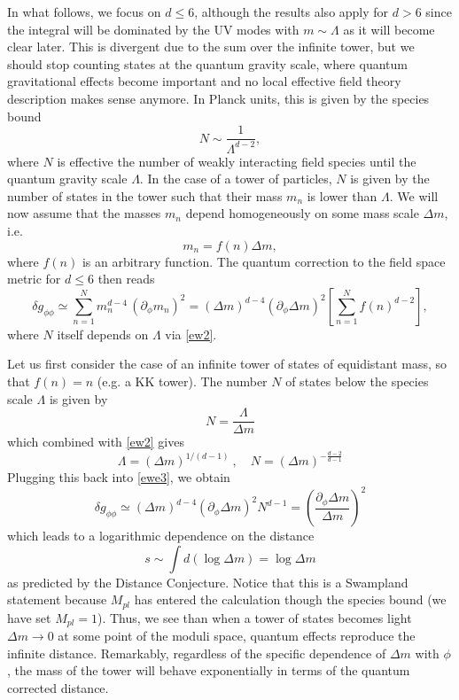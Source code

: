 \documentclass[11pt]{article}
\numberwithin{equation}{section}
\newcommand{\beq}{\begin{equation}}  \newcommand{\eeq}{\end{equation}}
\numberwithin{equation}{section}
\theoremstyle{remark}
\begin{document}
In what follows, we focus on $d\leq 6$, although the results also apply for $d>6$ since the integral will be dominated by the UV modes with $m\sim \Lambda$ as it will become clear later. 
This is divergent due to the sum over the infinite tower, but we should stop counting states at the quantum gravity scale, where quantum gravitational effects become important and no local effective field theory description makes sense anymore. In Planck units, this is given by the species bound \cite{ArkaniHamed:2005yv,Dvali:2007wp,Dvali:2007hz,Dvali:2010vm}
\begin{equation}N\sim \frac{1}{\Lambda^{d-2}},\label{ew2}\end{equation}
where $N$ is effective the number of weakly interacting field species until the quantum gravity scale $\Lambda$. In the case of a tower of particles, $N$ is given by  
the number of states in the tower such that their mass $m_n$ is lower than $\Lambda$.
 We will now assume that the masses $m_n$ depend homogeneously on some mass scale $\Delta m$, i.e.
%
\begin{equation}
 m_n=f(n) \Delta m,
 \end{equation}
where $f(n)$ is an arbitrary function. The quantum correction to the  field space metric for $d\leq 6$ then reads
\begin{equation} \delta g_{\phi\phi}\simeq  \sum^N_{n=1} m_n^{d-4}\, (\partial_\phi m_n)^2= (\Delta m)^{d-4}( \partial_\phi \Delta m)^2 \left[\sum^N_{n=1}f(n)^{d-2}\right],\label{ewe3}\end{equation}
where $N$ itself depends on $\Lambda$ via \eqref{ew2}.

 Let us first consider the case of an infinite tower of states of equidistant mass, so that $f(n)=n$ (e.g. a KK tower).
The number $N$ of states below the species scale $\Lambda$ is given by
\beq
N=\frac{\Lambda}{\Delta m}
\eeq
which combined with \eqref{ew2} gives
\beq
\Lambda=(\Delta m)^{1/(d-1)}\ , \quad N=( \Delta m)^{-\frac{d-2}{d-1}} 
\eeq
Plugging this back into \eqref{ewe3}, we obtain
\begin{equation} 
\delta g_{\phi\phi}\simeq (\Delta m)^{d-4} (\partial_\phi \Delta m)^2 N^{d-1}=\left(\frac{\partial_\phi \Delta m}{\Delta m}\right)^2
\end{equation}
which leads to a logarithmic dependence on the distance 
\begin{equation} 
s\sim\int d(\log\Delta m)=\log \Delta m
\end{equation}
as predicted by the Distance Conjecture.  Notice that this is a Swampland statement because $M_{pl}$ has entered the calculation though the species bound (we have set $M_{pl}=1$).  Thus, we see than when a tower of states becomes light $\Delta m\rightarrow0$ at some point of the moduli space, quantum effects reproduce the infinite distance. Remarkably, regardless of the specific dependence of $\Delta m$ with $\phi$, the mass of the tower will behave exponentially in terms of the quantum corrected distance.  
\end{document}
